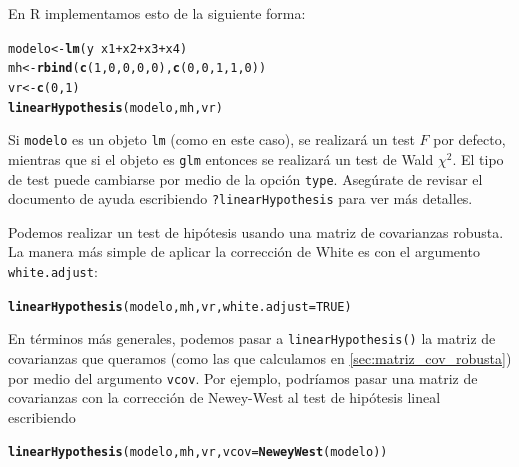 \documentclass{article}\usepackage[]{graphicx}\usepackage[]{color}
\makeatletter
\newcommand{\hlnum}[1]{\textcolor[rgb]{0.686,0.059,0.569}{#1}}%
\newcommand{\hlopt}[1]{\textcolor[rgb]{0,0,0}{#1}}%
\newcommand{\hlstd}[1]{\textcolor[rgb]{0.345,0.345,0.345}{#1}}%
\newcommand{\hlkwb}[1]{\textcolor[rgb]{0.69,0.353,0.396}{#1}}%
\newcommand{\hlkwc}[1]{\textcolor[rgb]{0.333,0.667,0.333}{#1}}%
\newcommand{\hlkwd}[1]{\textcolor[rgb]{0.737,0.353,0.396}{\textbf{#1}}}%
\newenvironment{kframe}{%
 \def\at@end@of@kframe{}%
 \ifinner\ifhmode%
  \def\at@end@of@kframe{\end{minipage}}%
  \begin{minipage}{\columnwidth}%
 \fi\fi%
 \def\FrameCommand##1{\hskip\@totalleftmargin \hskip-\fboxsep
 \colorbox{shadecolor}{##1}\hskip-\fboxsep
     \hskip-\linewidth \hskip-\@totalleftmargin \hskip\columnwidth}%
 \MakeFramed {\advance\hsize-\width
   \@totalleftmargin\z@ \linewidth\hsize
   \@setminipage}}%
 {\par\unskip\endMakeFramed%
 \at@end@of@kframe}
\newenvironment{knitrout}{}{} %
\makeatother
\begin{document}
En R implementamos esto de la siguiente forma:

\begin{knitrout}
\color{fgcolor}\begin{kframe}
\begin{alltt}
\hlstd{modelo} \hlkwb{<-} \hlkwd{lm}\hlstd{(y} \hlopt{~} \hlstd{x1} \hlopt{+} \hlstd{x2} \hlopt{+} \hlstd{x3} \hlopt{+} \hlstd{x4)}
\hlstd{mh} \hlkwb{<-} \hlkwd{rbind}\hlstd{(}\hlkwd{c}\hlstd{(}\hlnum{1}\hlstd{,}\hlnum{0}\hlstd{,}\hlnum{0}\hlstd{,}\hlnum{0}\hlstd{,}\hlnum{0}\hlstd{),} \hlkwd{c}\hlstd{(}\hlnum{0}\hlstd{,}\hlnum{0}\hlstd{,}\hlnum{1}\hlstd{,}\hlnum{1}\hlstd{,}\hlnum{0}\hlstd{))}
\hlstd{vr} \hlkwb{<-} \hlkwd{c}\hlstd{(}\hlnum{0}\hlstd{,}\hlnum{1}\hlstd{)}
\hlkwd{linearHypothesis}\hlstd{(modelo, mh, vr)}
\end{alltt}
\end{kframe}
\end{knitrout}

Si \verb|modelo| es un objeto \verb|lm| (como en este caso), se realizará un test $F$ por defecto, mientras que si el objeto es \verb|glm| entonces se realizará un test de Wald $\chi^2$. El tipo de test puede cambiarse por medio de la opción \verb|type|. Asegúrate de revisar el documento de ayuda escribiendo \verb|?linearHypothesis| para ver más detalles.

Podemos realizar un test de hipótesis usando una matriz de covarianzas robusta. La manera más simple de aplicar la corrección de White es con el argumento \verb|white.adjust|:

\begin{knitrout}
\color{fgcolor}\begin{kframe}
\begin{alltt}
\hlkwd{linearHypothesis}\hlstd{(modelo, mh, vr,} \hlkwc{white.adjust} \hlstd{=} \hlnum{TRUE}\hlstd{)}
\end{alltt}
\end{kframe}
\end{knitrout}

En términos más generales, podemos pasar a \verb|linearHypothesis()| la matriz de covarianzas que queramos (como las que calculamos en \ref{sec:matriz_cov_robusta}) por medio del argumento \verb|vcov|. Por ejemplo, podríamos pasar una matriz de covarianzas con la corrección de Newey-West al test de hipótesis lineal escribiendo

\begin{knitrout}
\color{fgcolor}\begin{kframe}
\begin{alltt}
\hlkwd{linearHypothesis}\hlstd{(modelo, mh, vr,} \hlkwc{vcov} \hlstd{=} \hlkwd{NeweyWest}\hlstd{(modelo))}
\end{alltt}
\end{kframe}
\end{knitrout}
\end{document}
